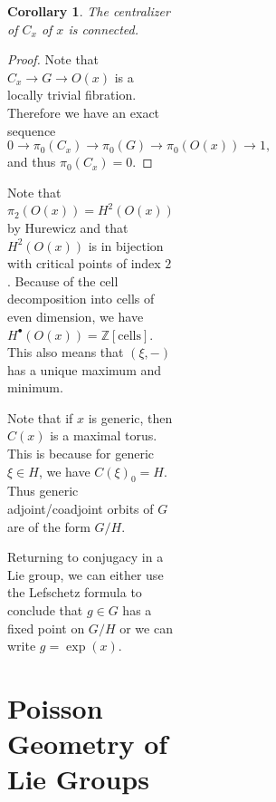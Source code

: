 \documentclass[leqno, openany]{memoir}
\newtheorem{cor}[thm]{Corollary}
\theoremstyle{definition}
\theoremstyle{remark}
\theoremstyle{plain}
\theoremstyle{definition}
\theoremstyle{remark}
\newcommand{\Z}{\mathbb{Z}}
\begin{document}
\begin{figure}[H]
\begin{figure}[H]
\begin{figure}[H]
\begin{figure}[H]
\begin{cor} The centralizer of $C_x$ of $x$ is connected.  \end{cor}

\begin{proof} Note that $C_x \to G \to O(x)$ is a locally trivial fibration.
    Therefore we have an exact sequence \[ 0 \to \pi_0(C_x) \to \pi_0(G) \to
    \pi_0(O(x)) \to 1, \] and thus $\pi_0(C_x) = 0$.  \end{proof}

Note that $\pi_2(O(x)) = H^2(O(x))$ by Hurewicz and that $H^2(O(x))$ is in
bijection with critical points of index $2$. Because of the cell decomposition
into cells of even dimension, we have $H^{\bullet}(O(x)) = \Z[\text{cells}]$.
This also means that $(\xi, -)$ has a unique maximum and minimum.

Note that if $x$ is generic, then $C(x)$ is a maximal torus. This is because
for generic $\xi \in H$, we have $C(\xi)_0 = H$. Thus generic adjoint/coadjoint
orbits of $G$ are of the form $G/H$.

Returning to conjugacy in a Lie group, we can either use the Lefschetz formula
to conclude that $g \in G$ has a fixed point on $G/H$ or we can write $g =
\exp(x)$.

\section{Poisson Geometry of Lie Groups}%


\end{figure}
\end{figure}
\end{figure}
\end{figure}
\end{document}
